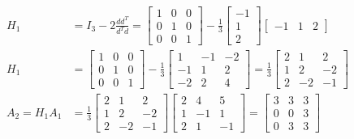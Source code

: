 \documentclass{exam}
\begin{document}
\begin{align*}
	H_1           & = I_3 - 2 \frac{d d^T}{d^T d} = \begin{bmatrix} 1 & 0 & 0 \\ 0 & 1 & 0 \\ 0 & 0 & 1 \end{bmatrix} - \frac{1}{3} \begin{bmatrix} -1 \\ 1 \\ 2 \end{bmatrix} \begin{bmatrix} -1 & 1 & 2 \end{bmatrix}                                        \\
	H_1           & = \begin{bmatrix} 1 & 0 & 0 \\ 0 & 1 & 0 \\ 0 & 0 & 1 \end{bmatrix} - \frac{1}{3} \begin{bmatrix} 1 & -1 & -2 \\ -1 & 1 & 2 \\ -2 & 2 & 4 \end{bmatrix} = \frac{1}{3} \begin{bmatrix} 2 & 1 & 2 \\ 1 & 2 & -2 \\ 2 & -2 & -1 \end{bmatrix} \\
	A_2 = H_1 A_1 & = \frac{1}{3} \begin{bmatrix} 2 & 1 & 2 \\ 1 & 2 & -2 \\ 2 & -2 & -1 \end{bmatrix} \begin{bmatrix} 2 & 4 & 5 \\ 1 & -1 & 1 \\ 2 & 1 & -1 \end{bmatrix} = \begin{bmatrix} 3 & 3 & 3 \\ 0 & 0 & 3 \\ 0 & 3 & 3 \end{bmatrix}
\end{align*}
\end{document}

